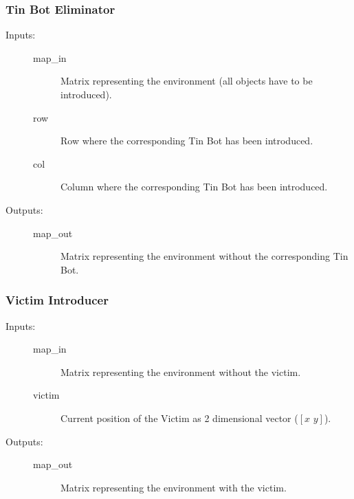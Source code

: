 \documentclass[a4paper,parskip,headheight=38pt]{scrartcl} %
\begin{document}
\subsubsection{Tin Bot Eliminator}
\begin{description}
\item[Inputs:] \hfill
	\begin{description}
	\item[map\_in] Matrix representing the environment (all objects have to be introduced).
	\item[row] Row where the corresponding Tin Bot has been introduced.
	\item[col] Column where the corresponding Tin Bot has been introduced.
	\end{description}
\item[Outputs:] \hfill
	\begin{description}
	\item[map\_out] Matrix representing the environment without the corresponding Tin Bot.
	\end{description}
\end{description}

\subsubsection{Victim Introducer}
\begin{description}
\item[Inputs:] \hfill
	\begin{description}
	\item[map\_in] Matrix representing the environment without the victim.
	\item[victim] Current position of the Victim as 2 dimensional vector ($[x\,\, y]$). 
	\end{description}
\item[Outputs:] \hfill
	\begin{description}
	\item[map\_out] Matrix representing the environment with the victim.
	\end{description}
\end{description}
\end{document}

